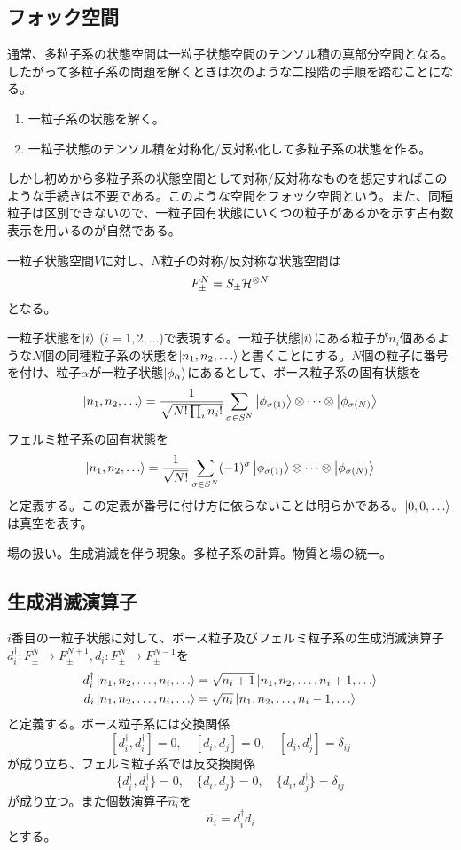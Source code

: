 \subsection{フォック空間}
    通常、多粒子系の状態空間は一粒子状態空間のテンソル積の真部分空間となる。したがって多粒子系の問題を解くときは次のような二段階の手順を踏むことになる。
    \begin{enumerate}
        \item 一粒子系の状態を解く。
        \item 一粒子状態のテンソル積を対称化/反対称化して多粒子系の状態を作る。
    \end{enumerate}
    しかし初めから多粒子系の状態空間として対称/反対称なものを想定すればこのような手続きは不要である。このような空間をフォック空間という。また、同種粒子は区別できないので、一粒子固有状態にいくつの粒子があるかを示す占有数表示を用いるのが自然である。

    一粒子状態空間$V$に対し、$N$粒子の対称/反対称な状態空間は
        \[F_\pm^N = S_\pm \mathcal{H}^{\otimes N}\]
    となる。

    一粒子状態を$\ket{i}$ ($i = 1, 2, \dots$)で表現する。一粒子状態$\ket{i}$にある粒子が$n_i$個あるような$N$個の同種粒子系の状態を$\ket{n_1, n_2, \dots}$と書くことにする。$N$個の粒子に番号を付け、粒子$\alpha$が一粒子状態$\ket{\phi_\alpha}$にあるとして、ボース粒子系の固有状態を
        \[\ket{n_1, n_2, \dots} = \frac{1}{\sqrt{N! \prod_i n_i!}} \sum_{\sigma \in S^N} \ket{\phi_{\sigma(1)}} \otimes \dots \otimes \ket{\phi_{\sigma(N)}}\]
    フェルミ粒子系の固有状態を
        \[\ket{n_1, n_2, \dots} = \frac{1}{\sqrt{N!}} \sum_{\sigma \in S^N} (-1)^\sigma \ket{\phi_{\sigma(1)}} \otimes \dots \otimes \ket{\phi_{\sigma(N)}}\]
    と定義する。この定義が番号に付け方に依らないことは明らかである。$\ket{0, 0, \dots}$は真空を表す。

    場の扱い。生成消滅を伴う現象。多粒子系の計算。物質と場の統一。

\subsection{生成消滅演算子}
    $i$番目の一粒子状態に対して、ボース粒子及びフェルミ粒子系の生成消滅演算子$d_i^\dagger: F_\pm^N \to F_\pm^{N+1}, d_i: F_\pm^N \to F_\pm^{N-1}$を
    \begin{align*}
        d_i^\dagger \ket{n_1, n_2, \dots, n_i, \dots} &= \sqrt{n_i + 1}\ket{n_1, n_2, \dots, n_i + 1, \dots}\\
        d_i \ket{n_1, n_2, \dots, n_i, \dots} &= \sqrt{n_i}\ket{n_1, n_2, \dots, n_i - 1, \dots}
    \end{align*}
    と定義する。ボース粒子系には交換関係
        \[[d_i^\dagger, d_i^\dagger] = 0, \quad [d_i, d_j] = 0, \quad [d_i, d_j^\dagger] = \delta_{ij}\]
    が成り立ち、フェルミ粒子系では反交換関係
        \[\{d_i^\dagger, d_i^\dagger\} = 0, \quad \{d_i, d_j\} = 0, \quad \{d_i, d_j^\dagger\} = \delta_{ij}\]
    が成り立つ。また個数演算子$\hat{n_i}$を
        \[\hat{n_i} = d_i^\dagger d_i\]
    とする。

